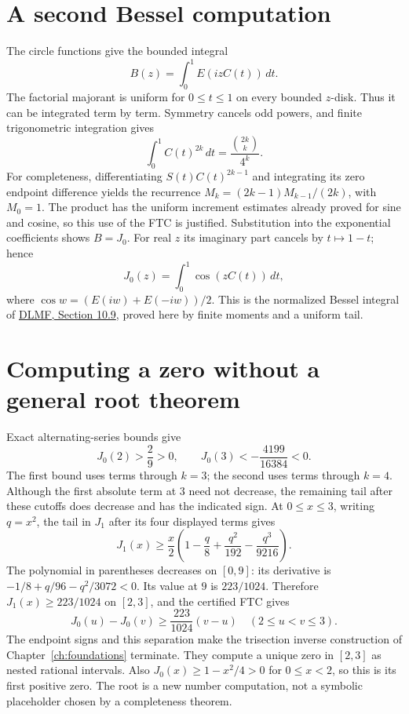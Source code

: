 \section{A second Bessel computation}
The circle functions give the bounded integral
\[
 B(z)=\int_0^1 E(izC(t))\,dt.
\]
The factorial majorant is uniform for $0\le t\le1$ on every bounded
$z$-disk.  Thus it can be integrated term by term.  Symmetry cancels odd
powers, and finite trigonometric integration gives
\[
 \int_0^1 C(t)^{2k}\,dt=\frac{\binom{2k}{k}}{4^k}.
\]
For completeness, differentiating $S(t)C(t)^{2k-1}$ and integrating its
zero endpoint difference yields the recurrence
$M_k=(2k-1)M_{k-1}/(2k)$, with $M_0=1$.
The product has the uniform increment estimates already proved for sine
and cosine, so this use of the FTC is justified.
Substitution into the exponential coefficients shows $B=J_0$.
For real $z$ its imaginary part cancels by $t\mapsto1-t$; hence
\[
 J_0(z)=\int_0^1\cos(zC(t))\,dt,
\]
where $\cos w=(E(iw)+E(-iw))/2$.  This is the normalized Bessel integral
of \href{https://dlmf.nist.gov/10.9}{DLMF, Section 10.9}, proved here
by finite moments and a uniform tail.

\section{Computing a zero without a general root theorem}
\label{sec:bessel-zero}
Exact alternating-series bounds give
\[
 J_0(2)>\frac29>0,\qquad J_0(3)<-\frac{4199}{16384}<0.
\]
The first bound uses terms through $k=3$; the second uses terms through
$k=4$.  Although the first absolute term at $3$ need not decrease, the
remaining tail after these cutoffs does decrease and has the indicated
sign.  At $0\le x\le3$, writing $q=x^2$, the tail in $J_1$ after its
four displayed terms gives
\[
 J_1(x)\ge\frac x2
       \left(1-\frac q8+\frac{q^2}{192}-\frac{q^3}{9216}\right).
\]
The polynomial in parentheses decreases on $[0,9]$: its derivative is
$-1/8+q/96-q^2/3072<0$.  Its value at $9$ is $223/1024$.
Therefore $J_1(x)\ge223/1024$ on $[2,3]$, and the certified FTC gives
\[
 J_0(u)-J_0(v)\ge\frac{223}{1024}(v-u)
 \quad(2\le u<v\le3).
\]
The endpoint signs and this separation make the trisection inverse
construction of Chapter~\ref{ch:foundations} terminate.  They compute a
unique zero in $[2,3]$ as nested rational intervals.  Also
$J_0(x)\ge1-x^2/4>0$ for $0\le x<2$, so this is its first positive
zero.  The root is a new number computation, not a symbolic placeholder
chosen by a completeness theorem.

